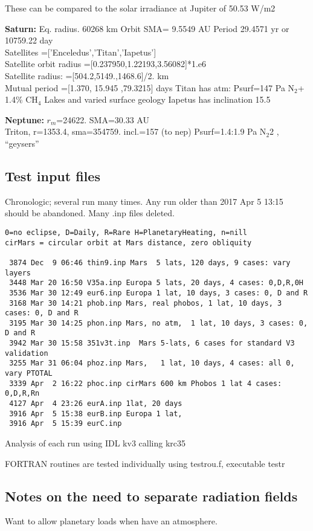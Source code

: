 \documentclass{article}
\begin{document}
These can be compared to the solar irradiance at Jupiter of 50.53 W/m2

\textbf{Saturn:} Eq. radius.  60268  km
\qi Orbit SMA= 9.5549  AU
\qi Period 29.4571 yr or 10759.22  day 
\\ Satellites =['Enceledus','Titan','Iapetus']
\\ Satellite orbit radius =[0.237950,1.22193,3.56082]*1.e6
\\ Satellite radius: =[504.2,5149.,1468.6]/2.  km 
\\ Mutual period =[1.370, 15.945 ,79.3215] days
\qi Titan has atm: Psurf=147 Pa N$_2$+ 1.4\% CH$_4$ 
\qii Lakes and varied surface geology
\qi Iapetus has inclination 15.5\qd

\textbf{Neptune:} $r_m$=24622. SMA=30.33 AU
\\ Triton, r=1353.4, sma=354759.  incl.=157 (to nep)
\qi Psurf=1.4:1.9 Pa N$_2$2 , ``geysers''


\subsection{Test input files}
Chronologic; several run many times. Any run older than 2017 Apr 5 13:15 should be abandoned. Many .inp files deleted.
\vspace{-3.mm} 
\begin{verbatim}
0=no eclipse, D=Daily, R=Rare H=PlanetaryHeating, n=nill 
cirMars = circular orbit at Mars distance, zero obliquity

 3874 Dec  9 06:46 thin9.inp Mars  5 lats, 120 days, 9 cases: vary layers
 3448 Mar 20 16:50 V35a.inp Europa 5 lats, 20 days, 4 cases: 0,D,R,0H
 3536 Mar 30 12:49 eur6.inp Europa 1 lat, 10 days, 3 cases: 0, D and R
 3168 Mar 30 14:21 phob.inp Mars, real phobos, 1 lat, 10 days, 3 cases: 0, D and R
 3195 Mar 30 14:25 phon.inp Mars, no atm,  1 lat, 10 days, 3 cases: 0, D and R
 3942 Mar 30 15:58 351v3t.inp  Mars 5-lats, 6 cases for standard V3 validation
 3255 Mar 31 06:04 phoz.inp Mars,   1 lat, 10 days, 4 cases: all 0, vary PTOTAL
 3339 Apr  2 16:22 phoc.inp cirMars 600 km Phobos 1 lat 4 cases: 0,D,R,Rn
 4127 Apr  4 23:26 eurA.inp 1lat, 20 days 
 3916 Apr  5 15:38 eurB.inp Europa 1 lat,
 3916 Apr  5 15:39 eurC.inp
\end{verbatim}

Analysis of each run using IDL kv3 calling krc35

FORTRAN routines are tested individually using testrou.f, executable testr

\subsection {Notes on the need to separate radiation fields}
Want to allow planetary loads when have an atmosphere.
\end{document}
